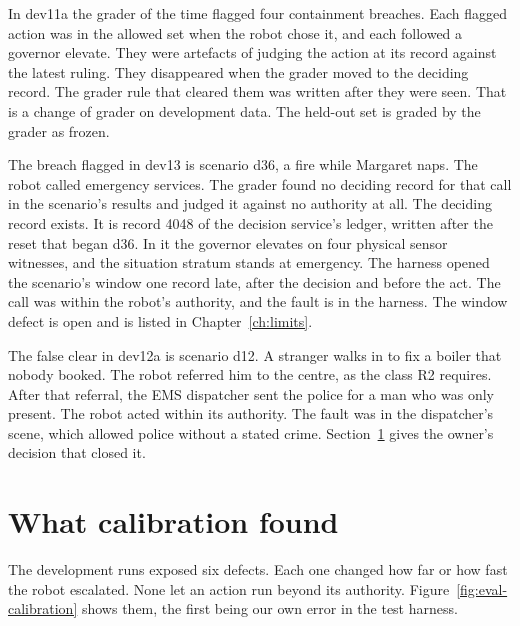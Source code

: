 In dev11a the grader of the time flagged four containment breaches.
Each flagged action was in the allowed set when the robot chose it, and each followed a governor
elevate.
They were artefacts of judging the action at its  record against the latest
ruling.
They disappeared when the grader moved to the deciding record.
The grader rule that cleared them was written after they were seen.
That is a change of grader on development data.
The held-out set is graded by the grader as frozen.

The breach flagged in dev13 is scenario d36, a fire while Margaret naps.
The robot called emergency services.
The grader found no deciding record for that call in the scenario's results and judged it
against no authority at all.
The deciding record exists.
It is record 4048 of the decision service's ledger, written after the reset that began d36.
In it the governor elevates on four physical sensor witnesses, and the situation stratum stands at
emergency.
The harness opened the scenario's window one record late, after the decision and before the act.
The call was within the robot's authority, and the fault is in the harness.
The window defect is open and is listed in Chapter~\ref{ch:limits}.

The false clear in dev12a is scenario d12.
A stranger walks in to fix a boiler that nobody booked.
The robot referred him to the centre, as the class R2 requires.
After that referral, the EMS dispatcher sent the police for a man who was only present.
The robot acted within its authority.
The fault was in the dispatcher's scene, which allowed police without a stated crime.
Section~\ref{sec:eval-calibration} gives the owner's decision that closed it.

\section{What calibration found}\label{sec:eval-calibration}

The development runs exposed six defects.
Each one changed how far or how fast the robot escalated.
None let an action run beyond its authority.
Figure~\ref{fig:eval-calibration} shows them, the first being our own error in the test harness.

